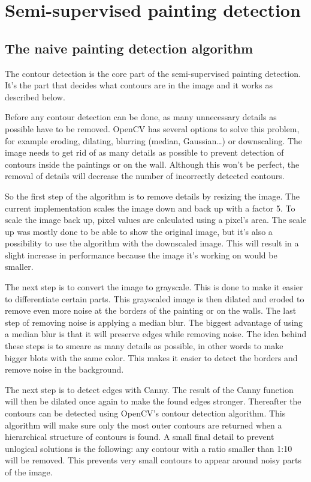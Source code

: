\section{Semi-supervised painting detection}
\label{sec:assignment1}

\subsection{The naive painting detection algorithm}
\label{subsec:contour_detection}

The contour detection is the core part of the semi-supervised painting detection. It's the part that decides what contours are in the image and it works as described below.

Before any contour detection can be done, as many unnecessary details as possible have to be removed. OpenCV has several options to solve this problem, for example eroding, dilating, blurring (median, Gaussian\dots) or downscaling. The image needs to get rid of as many details as possible to prevent detection of contours inside the paintings or on the wall. Although this won't be perfect, the removal of details will decrease the number of incorrectly detected contours.

So the first step of the algorithm is to remove details by resizing the image. The current implementation scales the image down and back up with a factor 5. To scale the image back up, pixel values are calculated using a pixel's area. The scale up was mostly done to be able to show the original image, but it's also a possibility to use the algorithm with the downscaled image. This will result in a slight increase in performance because the image it's working on would be smaller.

The next step is to convert the image to grayscale. This is done to make it easier to differentiate certain parts. This grayscaled image is then dilated and eroded to remove even more noise at the borders of the painting or on the walls. The last step of removing noise is applying a median blur. The biggest advantage of using a median blur is that it will preserve edges while removing noise. The idea behind these steps is to smeare as many details as possible, in other words to make bigger blots with the same color. This makes it easier to detect the borders and remove noise in the background.

The next step is to detect edges with Canny. The result of the Canny function will then be dilated once again to make the found edges stronger. Thereafter the contours can be detected using OpenCV's contour detection algorithm. This algorithm will make sure only the most outer contours are returned when a hierarchical structure of contours is found. A small final detail to prevent unlogical solutions is the following: any contour with a ratio smaller than 1:10 will be removed. This prevents very small contours to appear around noisy parts of the image.

